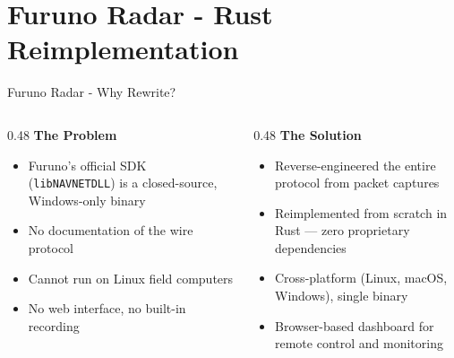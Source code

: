 \documentclass[10pt, aspectratio=169]{beamer}
\begin{document}
\section{Furuno Radar - Rust Reimplementation}

\begin{frame}{Furuno Radar - Why Rewrite?}
  \begin{columns}[T]
    \begin{column}{0.48\textwidth}
      \textbf{The Problem}
      \begin{itemize}
        \item Furuno's official SDK (\texttt{libNAVNETDLL}) is a closed-source, Windows-only binary
        \item No documentation of the wire protocol
        \item Cannot run on Linux field computers
        \item No web interface, no built-in recording
      \end{itemize}
    \end{column}
    \begin{column}{0.48\textwidth}
      \textbf{The Solution}
      \begin{itemize}
        \item Reverse-engineered the entire protocol from packet captures
        \item Reimplemented from scratch in Rust --- zero proprietary dependencies
        \item Cross-platform (Linux, macOS, Windows), single binary
        \item Browser-based dashboard for remote control and monitoring
      \end{itemize}
    \end{column}
  \end{columns}
\end{frame}
\end{document}
